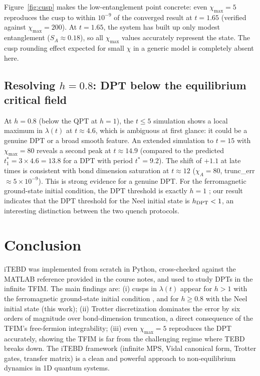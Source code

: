 \documentclass[11pt,a4paper]{article}
\begin{document}
Figure~\ref{fig:cusp} makes the low-entanglement point concrete: even
$\chi_{\max}=5$ reproduces the cusp to within $10^{-9}$ of the converged
result at $t=1.65$ (verified against $\chi_{\max}=200$). At $t=1.65$, the system has built up only modest entanglement
($S_A \approx 0.18$), so all $\chi_{\max}$ values accurately represent the
state. The cusp rounding effect expected for small $\chi$ in a generic model
is completely absent here.

\subsection{Resolving $h=0.8$: DPT below the equilibrium critical field}
\label{sec:h08}

At $h=0.8$ (below the QPT at $h=1$), the $t\leq 5$ simulation shows a local
maximum in $\lambda(t)$ at $t\approx 4.6$, which is ambiguous at first glance:
it could be a genuine DPT or a broad smooth feature. An extended simulation to
$t=15$ with $\chi_{\max}=80$ reveals a second peak at $t\approx 14.9$ (compared
to the predicted $t^*_1 = 3\times 4.6 = 13.8$ for a DPT with period
$t^*=9.2$). The shift of $+1.1$ at late times is consistent with bond dimension
saturation at $t\approx 12$ ($\chi_A = 80$, trunc\_err $\approx 5\times10^{-9}$).
This is strong evidence for a genuine DPT. For the ferromagnetic ground-state
initial condition, the DPT threshold is exactly $h=1$ \cite{heyl2013}; our
result indicates that the DPT threshold for the Neel initial state is
$h_{\rm DPT} < 1$, an interesting distinction between the two quench protocols.

\section{Conclusion}

iTEBD was implemented from scratch in Python, cross-checked against the MATLAB
reference provided in the course notes, and used to study DPTs in the
infinite TFIM. The main findings are: (i) cusps in $\lambda(t)$ appear for $h>1$ with the
ferromagnetic ground-state initial condition \cite{heyl2013}, and for $h\geq
0.8$ with the Neel initial state (this work);
(ii) Trotter discretization dominates the error by six orders of magnitude over
bond-dimension truncation, a direct consequence of the TFIM's free-fermion
integrability; (iii) even $\chi_{\max}=5$ reproduces the DPT accurately,
showing the TFIM is far from the challenging regime where TEBD breaks down. The
iTEBD framework (infinite MPS, Vidal canonical form, Trotter gates, transfer
matrix) is a clean and powerful approach to non-equilibrium dynamics in 1D
quantum systems.
\end{document}
